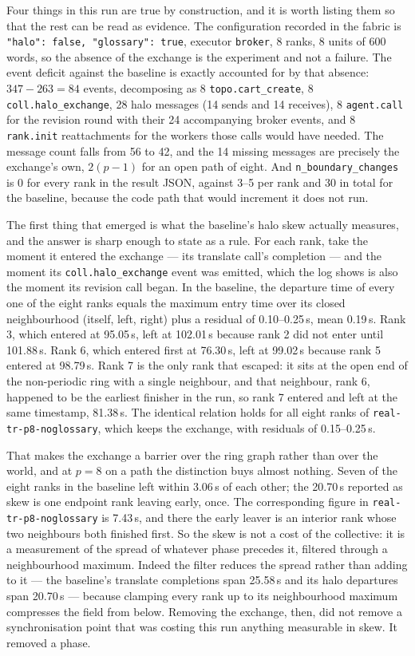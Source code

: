 \documentclass[11pt]{article}
\begin{document}
Four things in this run are true by construction, and it is worth listing them so that the rest can
be read as evidence. The configuration recorded in the fabric is
\texttt{"halo": false, "glossary": true}, executor \texttt{broker}, 8 ranks, 8 units of 600 words, so
the absence of the exchange is the experiment and not a failure. The event deficit against the
baseline is exactly accounted for by that absence: $347-263=84$ events, decomposing as 8
\texttt{topo.cart\_create}, 8 \texttt{coll.halo\_exchange}, 28 halo messages (14 sends and 14
receives), 8 \texttt{agent.call} for the revision round with their 24 accompanying broker events, and
8 \texttt{rank.init} reattachments for the workers those calls would have needed. The message count
falls from 56 to 42, and the 14 missing messages are precisely the exchange's own, $2(p-1)$ for an
open path of eight. And \texttt{n\_boundary\_changes} is 0 for every rank in the result JSON, against
3--5 per rank and 30 in total for the baseline, because the code path that would increment it does not
run.

The first thing that emerged is what the baseline's halo skew actually measures, and the answer is
sharp enough to state as a rule. For each rank, take the moment it entered the exchange --- its
translate call's completion --- and the moment its \texttt{coll.halo\_exchange} event was emitted,
which the log shows is also the moment its revision call began. In the baseline, the departure time
of every one of the eight ranks equals the maximum entry time over its closed neighbourhood (itself,
left, right) plus a residual of 0.10--0.25\,s, mean 0.19\,s. Rank 3, which entered at 95.05\,s, left at
102.01\,s because rank 2 did not enter until 101.88\,s. Rank 6, which entered first at 76.30\,s, left
at 99.02\,s because rank 5 entered at 98.79\,s. Rank 7 is the only rank that escaped: it sits at the
open end of the non-periodic ring with a single neighbour, and that neighbour, rank 6, happened to be
the earliest finisher in the run, so rank 7 entered and left at the same timestamp, 81.38\,s. The
identical relation holds for all eight ranks of \texttt{real-tr-p8-noglossary}, which keeps the
exchange, with residuals of 0.15--0.25\,s.

That makes the exchange a barrier over the ring graph rather than over the world, and at $p=8$ on a
path the distinction buys almost nothing. Seven of the eight ranks in the baseline left within 3.06\,s
of each other; the 20.70\,s reported as skew is one endpoint rank leaving early, once. The
corresponding figure in \texttt{real-tr-p8-noglossary} is 7.43\,s, and there the early leaver is an
interior rank whose two neighbours both finished first. So the skew is not a cost of the collective:
it is a measurement of the spread of whatever phase precedes it, filtered through a neighbourhood
maximum. Indeed the filter reduces the spread rather than adding to it --- the baseline's translate
completions span 25.58\,s and its halo departures span 20.70\,s --- because clamping every rank up to
its neighbourhood maximum compresses the field from below. Removing the exchange, then, did not
remove a synchronisation point that was costing this run anything measurable in skew. It removed a
phase.
\end{document}
